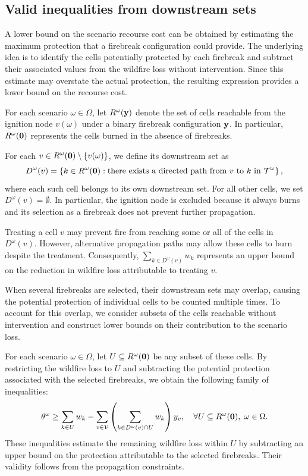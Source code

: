 \documentclass[a4paper,fleqn]{cas-sc}
\begin{document}
\subsection{Valid inequalities from downstream sets}
\label{subsec:coverage_inequalities}

A lower bound on the scenario recourse cost can be obtained by estimating the maximum protection that a firebreak configuration could provide. The underlying idea is to identify the cells potentially protected by each firebreak and subtract their associated values from the wildfire loss without intervention. Since this estimate may overstate the actual protection, the resulting expression provides a lower bound on the recourse cost.

For each scenario $\omega \in \Omega$, let $R^\omega(\vb{y})$ denote the set of cells reachable from the ignition node $v(\omega)$ under a binary firebreak configuration $\vb{y}$. In particular, $R^\omega(\vb{0})$ represents the cells burned in the absence of firebreaks.

For each $v \in R^\omega(\vb{0}) \setminus \{v(\omega)\}$, we define its downstream set as
%
\begin{equation}
\label{eq:downstream_set}
D^\omega(v) =
\left\{
k \in R^\omega(\vb{0}) :
\text{there exists a directed path from } v
\text{ to } k \text{ in } \mathcal{T}^\omega
\right\},
\end{equation}
%
where each such cell belongs to its own downstream set. For all other cells, we set $D^\omega(v)=\emptyset$. In particular, the ignition node is excluded because it always burns and its selection as a firebreak does not prevent further propagation.

Treating a cell $v$ may prevent fire from reaching some or all of the cells in $D^\omega(v)$. However, alternative propagation paths may allow these cells to burn despite the treatment. Consequently, $\sum_{k \in D^\omega(v)} w_k$ represents an upper bound on the reduction in wildfire loss attributable to treating $v$.

When several firebreaks are selected, their downstream sets may overlap, causing the potential protection of individual cells to be counted multiple times. To account for this overlap, we consider subsets of the cells reachable without intervention and construct lower bounds on their contribution to the scenario loss.

For each scenario $\omega \in \Omega$, let $U \subseteq R^\omega(\vb{0})$ be any subset of these cells. By restricting the wildfire loss to $U$ and subtracting the potential protection associated with the selected firebreaks, we obtain the following family of inequalities:
\begin{equation}
\label{eq:coverage_projected}
\theta^\omega \geq
\sum_{k \in U} w_k
-
\sum_{v \in \mathcal{V}}
\left(
\sum_{k \in D^\omega(v) \cap U} w_k
\right)y_v,
\quad
\forall U \subseteq R^\omega(\vb{0}),\;
\omega \in \Omega.
\end{equation}
%
These inequalities estimate the remaining wildfire loss within $U$ by subtracting an upper bound on the protection attributable to the selected firebreaks. Their validity follows from the propagation constraints.
\end{document}
